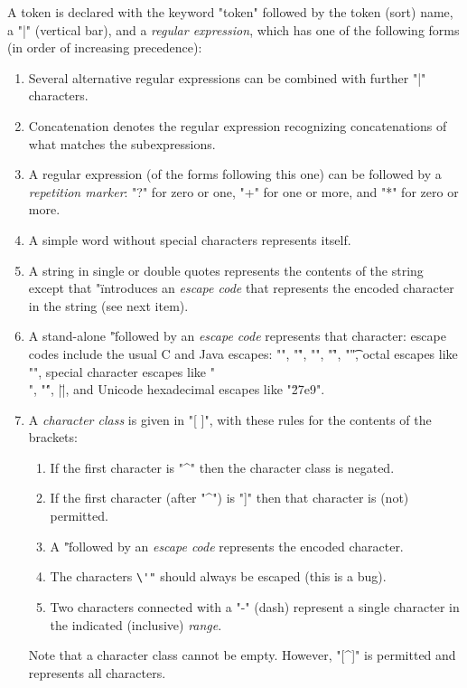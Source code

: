 \documentclass[11pt]{article} %
\begin{document}
\begin{manual}\label{man:token}
  A token is declared with the keyword "token" followed by the token (sort) name, a "|" (vertical
  bar), and a \emph{regular expression}, which has one of the following forms (in order of
  increasing precedence):
  \begin{enumerate}

  \item Several alternative regular expressions can be combined with further "|" characters.

  \item Concatenation denotes the regular expression recognizing concatenations of what matches the
    subexpressions.

  \item A regular expression (of the forms following this one) can be followed by a \emph{repetition
      marker}: "?" for zero or one, "+" for one or more, and "*" for zero or more.

  \item A simple word without special characters represents itself.

  \item A string in single or double quotes represents the contents of the string except that "\"
    introduces an \emph{escape code} that represents the encoded character in the string (see next item).

  \item A stand-alone "\" followed by an \emph{escape code} represents that character: escape codes
    include the usual C and Java escapes: "\n", "\r", "\a", "\f", "\t", octal escapes like "",
    special character escapes like "\\", "\'", \hacsc|\"|, and Unicode hexadecimal escapes like
    "\u27e9".

  \item A \emph{character class} is given in "[ ]", with these rules for the contents of the brackets:
   \begin{enumerate}
    \item If the first character is "^" then the character class is negated.
    \item If the first character (after "^") is "]" then that character is (not) permitted.
    \item A "\" followed by an \emph{escape code} represents the encoded character.
    \item The characters \verb|\'"| should always be escaped (this is a bug).
    \item Two characters connected with a "-" (dash) represent a single character in the indicated
      (inclusive) \emph{range}.
    \end{enumerate}
    Note that a character class cannot be empty. However, "[^]" is permitted and represents all
    characters.


\end{enumerate}
\end{manual}
\end{document}
